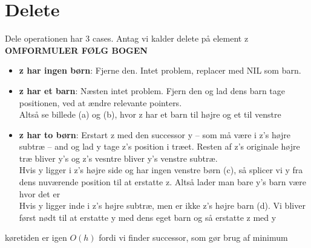 \documentclass[11pt,a4paper]{report}
\theoremstyle{plain}
\theoremstyle{definition}
\theoremstyle{remark}
\numberwithin{equation}{section}
\begin{document}
\section{Delete}
Dele operationen har 3 cases. Antag vi kalder delete på element z \textbf{OMFORMULER FØLG BOGEN}
\begin{itemize}
  \item \textbf{z har ingen børn}: Fjerne den. Intet problem, replacer med NIL som barn.\\
  \item \textbf{z har et barn}: Næsten intet problem. Fjern den og lad dens barn tage positionen, ved at ændre relevante pointers.\\
      Altså se billede (a) og (b), hvor z har et barn til højre og et til venstre
  \item \textbf{z har to børn}: Erstart z med den successor y -- som må være i z's højre subtræ -- and og lad y tage z's position i træet. Resten af z's originale højre træ bliver  y's og z's vesntre bliver y's venstre subtræ.\\
      Hvis y ligger i z's højre side og har ingen venstre børn (c), så splicer vi y fra dens nuværende position til at erstatte z. Altså lader man bare y's barn være hvor det er\\
      Hvis y ligger inde i z's højre subtræ, men er ikke z's højre barn (d). Vi bliver først nødt til at erstatte y med dens eget barn og så erstatte z med y\\
\end{itemize}

køretiden er igen $O(h)$ fordi vi finder successor, som gør brug af minimum
\end{document}
